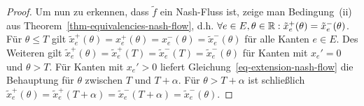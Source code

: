 \begin{proof}
	Um nun zu erkennen, dass $\tilde{f}$ ein Nash-Fluss ist, zeige man Bedingung~(ii) aus Theorem~\ref{thm-equivalencies-nash-flow}, d.h. $\forall e\in E, \theta\in\mathbb{R}: \tilde{x}_e^+(\theta) = \tilde{x}_e^-(\theta)$.
	Für $\theta \leq T$ gilt $\tilde{x}_e^+(\theta) = x_e^+(\theta) = x_e^-(\theta) = \tilde{x}_e^-(\theta)$ für alle Kanten $e\in E$.
	Des Weiteren gilt $\tilde{x}_e^+(\theta) = \tilde{x}_e^+(T) = \tilde{x}_e^-(T) = \tilde{x}_e^-(\theta)$ für Kanten mit $x_{e}' = 0$ und $\theta > T$.
	Für Kanten mit $x_e'>0$ liefert Gleichung~\ref{eq-extension-nash-flow} die Behauptung für $\theta$ zwischen $T$ und $T+\alpha$.
	Für $\theta > T+\alpha$ ist schließlich $\tilde{x}_e^+(\theta) = \tilde{x}_e^+(T + \alpha) = \tilde{x}_e^-(T+\alpha) = \tilde{x}_e^-(\theta)$.
\end{proof}

\begin{example}
\end{example}